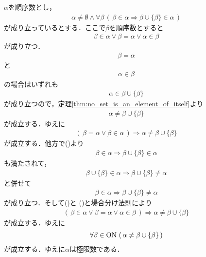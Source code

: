 	\begin{sketch}
		$\alpha$を順序数とし，
		\begin{align}
			\alpha \neq \emptyset \wedge 
			\forall \beta\, \left(\, \beta \in \alpha \Longrightarrow \beta \cup \{\beta\} \in \alpha\, \right)
			\label{fom:thm_if_closed_for_latter_then_limit_ordinal_1}
		\end{align}
		が成り立っているとする．ここで$\beta$を順序数とすると
		\begin{align}
			\beta \in \alpha \vee \beta = \alpha \vee \alpha \in \beta
		\end{align}
		が成り立つ．
		\begin{align}
			\beta = \alpha
		\end{align}
		と
		\begin{align}
			\alpha \in \beta
		\end{align}
		の場合はいずれも
		\begin{align}
			\alpha \in \beta \cup \{\beta\}
		\end{align}
		が成り立つので，定理\ref{thm:no_set_is_an_element_of_itself}より
		\begin{align}
			\alpha \neq \beta \cup \{\beta\}
		\end{align}
		が成立する．ゆえに
		\begin{align}
			(\, \beta = \alpha \vee \beta \in \alpha\, ) \Longrightarrow \alpha \neq \beta \cup \{\beta\}
			\label{fom:thm_if_closed_for_latter_then_limit_ordinal_2}
		\end{align}
		が成立する．他方で()より
		\begin{align}
			\beta \in \alpha \Longrightarrow \beta \cup \{\beta\} \in \alpha
		\end{align}
		も満たされて，
		\begin{align}
			\beta \cup \{\beta\} \in \alpha \Longrightarrow \beta \cup \{\beta\} \neq \alpha
		\end{align}
		と併せて
		\begin{align}
			\beta \in \alpha \Longrightarrow \beta \cup \{\beta\} \neq \alpha
			\label{fom:thm_if_closed_for_latter_then_limit_ordinal_3}
		\end{align}
		が成り立つ．そして()と
		()と場合分け法則により
		\begin{align}
			\left(\, \beta \in \alpha \vee \beta = \alpha \vee \alpha \in \beta\, \right)
			\Longrightarrow \alpha \neq \beta \cup \{\beta\}
		\end{align}
		が成立する．ゆえに
		\begin{align}
			\forall \beta \in \mathrm{ON}\, \left(\, \alpha \neq \beta \cup \{\beta\}\, \right)
		\end{align}
		が成立する．ゆえに$\alpha$は極限数である．
		\QED
	\end{sketch}
	

